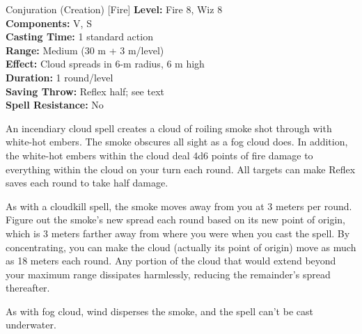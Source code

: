 {Conjuration (Creation) [Fire]}
{
	\textbf{Level:}
	Fire 8, Wiz 8\\
	\textbf{Components:}
	V, S\\
	\textbf{Casting Time:}
	1 standard action\\
	\textbf{Range:}
	Medium (30 m + 3 m/level)\\
	\textbf{Effect:}
	Cloud spreads in 6-m radius, 6 m high\\
	\textbf{Duration:}
	1 round/level\\
	\textbf{Saving Throw:}
	Reflex half; see text\\
	\textbf{Spell Resistance:}
	No\\
}
{
	An incendiary cloud spell creates a cloud of roiling smoke shot through with white-hot embers. The smoke obscures all sight as a fog cloud does. In addition, the white-hot embers within the cloud deal 4d6 points of fire damage to everything within the cloud on your turn each round. All targets can make Reflex saves each round to take half damage.

	As with a cloudkill spell, the smoke moves away from you at 3 meters per round. Figure out the smoke's new spread each round based on its new point of origin, which is 3 meters farther away from where you were when you cast the spell. By concentrating, you can make the cloud (actually its point of origin) move as much as 18 meters each round. Any portion of the cloud that would extend beyond your maximum range dissipates harmlessly, reducing the remainder's spread thereafter.

	As with fog cloud, wind disperses the smoke, and the spell can't be cast underwater.

}
